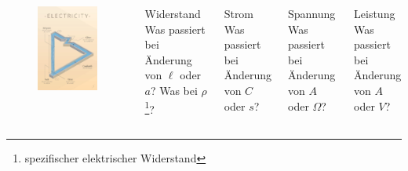 \begin{frame}
  \begin{columns}
      \begin{center}
	 \begin{figure}
        \includegraphics[width=\textwidth,height=.8\textheight,keepaspectratio]{e03/electricity.jpg}\\
      \end{figure}
      \end{center}
      \pause
      \begin{exampleblock}{Widerstand}
	Was passiert bei Änderung von $\ell$ oder $a$? Was bei $\rho$\footnote{\tiny spezifischer elektrischer Widerstand}?
      \end{exampleblock}
      \pause
      \begin{exampleblock}{Strom}
	Was passiert bei Änderung von $C$ oder $s$?
      \end{exampleblock}
      \pause
      \begin{exampleblock}{Spannung}
	Was passiert bei Änderung von $A$ oder $\Omega$?
      \end{exampleblock}
      \pause
      \begin{exampleblock}{Leistung}
	Was passiert bei Änderung von $A$ oder $V$?
      \end{exampleblock}
  \end{columns}
\end{frame}

